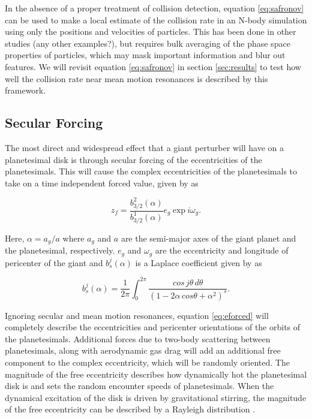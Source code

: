 \documentclass[twocolumn]{aastex63}
\begin{document}
In the absence of a proper treatment of collision detection, equation \ref{eq:safronov} can be used to make a local estimate of the 
collision rate in an N-body simulation using only the positions and velocities of particles. This has been done in other studies 
\citep{2017ApJ...850..103B} (any other examples?), but requires bulk averaging of the phase space properties of particles, which 
may mask important information and blur out features. We will revisit equation \ref{eq:safronov} in section \ref{sec:results} to test 
how well the collision rate near mean motion resonances is described by this framework.

\subsection{Secular Forcing}\label{sec:sec_force}

The most direct and widespread effect that a giant perturber will have on a planetesimal disk is through secular forcing of the 
eccentricities of the planetesimals. This will cause the complex eccentricities of the planetesimals to take on a time independent 
forced value, given by \citep{1999ApJ...527..918W} as

\begin{equation}\label{eq:eforced}
	z_{f} = \frac{b^{2}_{3/2} (\alpha)}{b^{1}_{3/2} (\alpha)} e_{g} ~ \mathrm{exp} ~ i \omega_{g}.
\end{equation}

\noindent Here, $\alpha = a_{g} / a$ where $a_{g}$ and $a$ are the semi-major axes of the giant planet and the planetesimal, 
respectively. $e_{g}$ and $\omega_{g}$ are the eccentricity and longitude of pericenter of the giant and $b^{j}_{s} (\alpha)$ is a 
Laplace coefficient given by \citep{2000ssd..book.....M} as

\begin{equation}\label{eq:lap}
	b_{s}^{j}(\alpha) = \frac{1}{2 \pi} \int_{0}^{2 \pi} \frac{cos \, j \theta \, d \theta}{\left( 1 - 2 \alpha \, cos \theta + \alpha^2 \right)^{s}}.
\end{equation}

Ignoring secular and mean motion resonances, equation \ref{eq:eforced} will completely describe the eccentricities and pericenter 
orientations of the orbits of the planetesimals. Additional forces due to two-body scattering between planetesimals, along with 
aerodynamic gas drag will add an additional free component to the complex eccentricity, which will be randomly oriented. The 
magnitude of the free eccentricity describes how dynamically hot the planetesimal disk is and sets the random encounter speeds of 
planetesimals. When the dynamical excitation of the disk is driven by gravitational stirring, the magnitude of the free eccentricity can 
be described by a Rayleigh distribution \citep{1992Icar...96..107I}.
\end{document}
